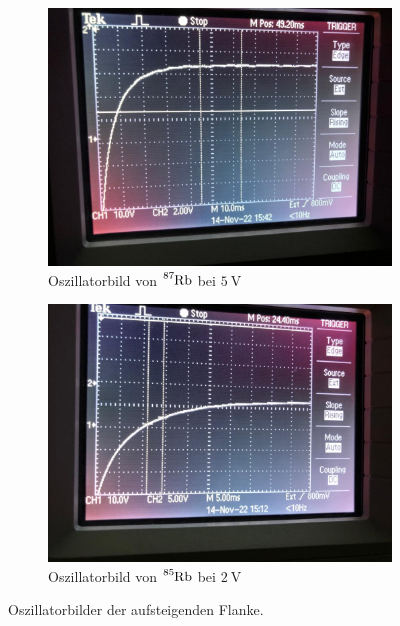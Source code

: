 \begin{figure}
    \centering
    \begin{subfigure}{0.4\textwidth}
        \centering
        \includegraphics[width=\textwidth]{plots/peak1_5V.jpeg}
        \caption{Oszillatorbild von $\ce{^{87}Rb}$ bei $\qty{5}{\volt}$}
    \end{subfigure}
    \begin{subfigure}{0.4\textwidth}
        \centering
        \includegraphics[width=\textwidth]{plots/peak2_2V.jpeg}
        \caption{Oszillatorbild von $\ce{^{85}Rb}$ bei $\qty{2}{\volt}$}
    \end{subfigure}
    \caption{Oszillatorbilder der aufsteigenden Flanke.}
    \label{fig:oszi}
\end{figure}
